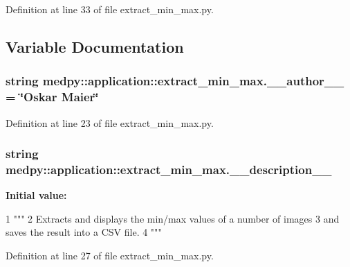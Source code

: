 Definition at line 33 of file extract\_\-min\_\-max.py.



\subsection{Variable Documentation}
\hypertarget{namespacemedpy_1_1application_1_1extract__min__max_a960faed32a5a52c1107b15395cf250cd}{
\subsubsection[{\_\-\_\-author\_\-\_\-}]{\setlength{\rightskip}{0pt plus 5cm}string {\bf medpy::application::extract\_\-min\_\-max.\_\-\_\-author\_\-\_\-} = \char`\"{}Oskar Maier\char`\"{}}}
\label{namespacemedpy_1_1application_1_1extract__min__max_a960faed32a5a52c1107b15395cf250cd}


Definition at line 23 of file extract\_\-min\_\-max.py.

\hypertarget{namespacemedpy_1_1application_1_1extract__min__max_a4fb60fcb8e1e5167d1cbae84588e449e}{
\subsubsection[{\_\-\_\-description\_\-\_\-}]{\setlength{\rightskip}{0pt plus 5cm}string {\bf medpy::application::extract\_\-min\_\-max.\_\-\_\-description\_\-\_\-}}}
\label{namespacemedpy_1_1application_1_1extract__min__max_a4fb60fcb8e1e5167d1cbae84588e449e}
{\bfseries Initial value:}
\begin{DoxyCode}
1 """
2                   Extracts and displays the min/max values of a number of images
3                   and saves the result into a CSV file.
4                   """
\end{DoxyCode}


Definition at line 27 of file extract\_\-min\_\-max.py.

